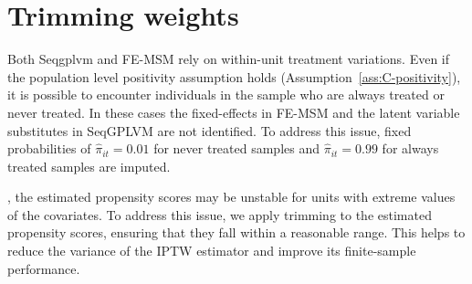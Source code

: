 \section{Trimming weights}
\label{sec:trimming}
Both Seqgplvm and FE-MSM rely on within-unit treatment variations. Even if the 
population level positivity assumption holds (Assumption~\ref{ass:C-positivity}), 
it is possible to encounter individuals in the sample who are always 
treated or never treated. In these cases the fixed-effects in FE-MSM 
and the latent variable substitutes in SeqGPLVM are not identified. To address this issue, 
fixed probabilities of $\hat\pi_{it} = 0.01$ for never treated samples 
and $\hat\pi_{it} = 0.99$ for always treated samples are imputed. 

, the estimated propensity scores may be unstable for units with extreme values of the covariates. To address this issue, we apply trimming to the estimated propensity scores, ensuring that they fall within a reasonable range. This helps to reduce the variance of the IPTW estimator and improve its finite-sample performance.